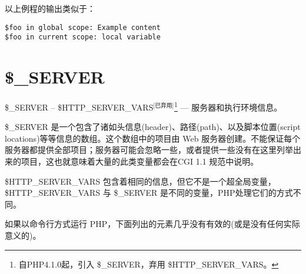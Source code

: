 以上例程的输出类似于：

\begin{verbatim}
$foo in global scope: Example content
$foo in current scope: local variable
\end{verbatim}


\section{\$\_SERVER}


\$\_SERVER -- \$HTTP\_SERVER\_VARS$^{\text{[已弃用]}}$\footnote{自PHP4.1.0起，引入 \$\_SERVER，弃用 \$HTTP\_SERVER\_VARS。} — 服务器和执行环境信息。

\$\_SERVER 是一个包含了诸如头信息(header)、路径(path)、以及脚本位置(script locations)等等信息的数组。这个数组中的项目由 Web 服务器创建。不能保证每个服务器都提供全部项目；服务器可能会忽略一些，或者提供一些没有在这里列举出来的项目，这也就意味着大量的此类变量都会在CGI 1.1 规范中说明。

\$HTTP\_SERVER\_VARS 包含着相同的信息，但它不是一个超全局变量，\$HTTP\_SERVER\_VARS 与 \$\_SERVER 是不同的变量，PHP处理它们的方式不同。


如果以命令行方式运行 PHP，下面列出的元素几乎没有有效的(或是没有任何实际意义的)。

